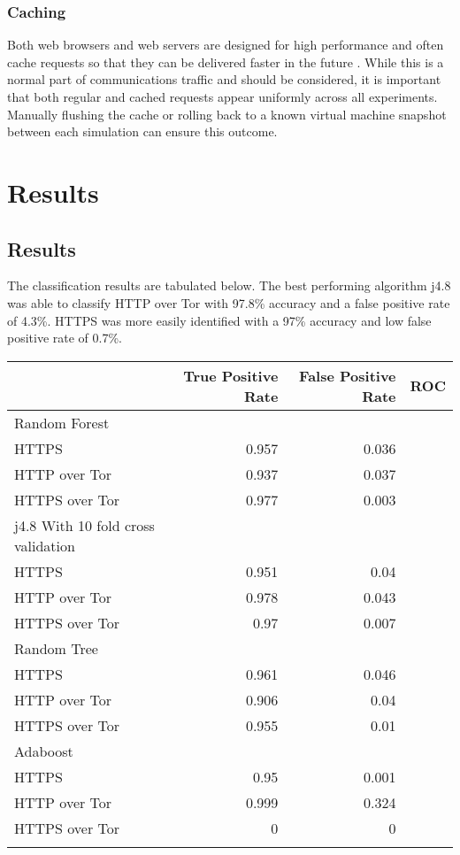 \documentclass{ecuthesis}
\begin{document}
\subsection{Caching}

Both web browsers and web servers are designed for high performance and often
cache requests so that they can be delivered faster in the future
\parencite{Caceres:1998p7419}. While this is a normal part of communications
traffic and should be considered, it is important that both regular and cached
requests appear uniformly across all experiments. Manually flushing the cache
or rolling back to a known virtual machine snapshot between each simulation can
ensure this outcome.



\chapter{Results}

\section{Results}

The classification results are tabulated below. The best performing algorithm
j4.8 was able to classify HTTP over Tor with 97.8\% accuracy and a false
positive rate of 4.3\%. HTTPS was more easily identified with a 97\% accuracy
and low false positive rate of 0.7\%.

\begin{tabular}{lrrr}
  \toprule
  & True Positive Rate & False Positive Rate & ROC \\
  \midrule
  Random Forest\\
  \midrule
  HTTPS & 0.957 & 0.036\\
  HTTP over Tor & 0.937 & 0.037\\
  HTTPS over Tor & 0.977 & 0.003\\
  \midrule
  j4.8 With 10 fold cross validation\\
  \midrule
  HTTPS & 0.951 & 0.04\\
  HTTP over Tor & 0.978 & 0.043\\
  HTTPS over Tor & 0.97 & 0.007\\
  \midrule
  Random Tree\\
  \midrule
  HTTPS & 0.961 & 0.046\\
  HTTP over Tor & 0.906 & 0.04\\
  HTTPS over Tor & 0.955 & 0.01\\
  \midrule
  Adaboost\\
  \midrule
  HTTPS & 0.95 & 0.001\\
  HTTP over Tor & 0.999 & 0.324\\
  HTTPS over Tor & 0 & 0\\
  \bottomrule
  \label{table:results}
\end{tabular}
\end{document}
